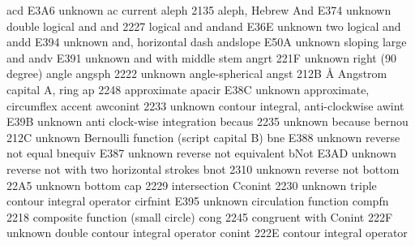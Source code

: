 %
%

 acd                              E3A6 {unknown} ac current
 aleph                            2135 {\aleph} aleph, Hebrew
 And                              E374 {unknown} double logical and
 and                              2227 {\wedge} logical and
 andand                           E36E {unknown} two logical and
 andd                             E394 {unknown} and, horizontal dash
 andslope                         E50A {unknown} sloping large and
 andv                             E391 {unknown} and with middle stem
 angrt                            221F {unknown} right (90 degree) angle
 angsph                           2222 {unknown} angle-spherical
 angst                            212B {\AA} Angstrom capital A, ring
 ap                               2248 {\approx} approximate
 apacir                           E38C {unknown} approximate, circumflex accent
 awconint                         2233 {unknown} contour integral, anti-clockwise
 awint                            E39B {unknown} anti clock-wise integration
 becaus                           2235 {unknown} because
 bernou                           212C {unknown} Bernoulli function (script capital B)
 bne                              E388 {unknown} reverse not equal
 bnequiv                          E387 {unknown} reverse not equivalent
 bNot                             E3AD {unknown} reverse not with two horizontal strokes
 bnot                             2310 {unknown} reverse not
 bottom                           22A5 {unknown} bottom
 cap                              2229 {\cap} intersection
 Cconint                          2230 {unknown} triple contour integral operator
 cirfnint                         E395 {unknown} circulation function
 compfn                           2218 {\circ} composite function (small circle)
 cong                             2245 {\cong} congruent with
 Conint                           222F {unknown} double contour integral operator
 conint                           222E {\oint} contour integral operator
